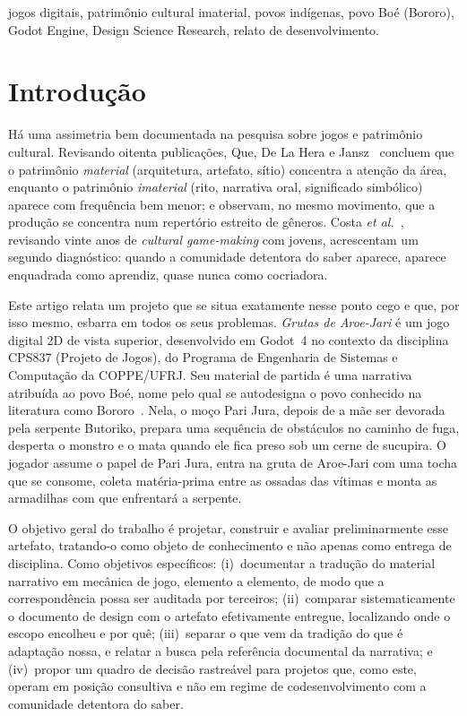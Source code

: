 \documentclass[conference]{IEEEtran}
\begin{document}
\begin{IEEEkeywords}
jogos digitais, patrimônio cultural imaterial, povos indígenas, povo Boé (Bororo),
Godot Engine, Design Science Research, relato de desenvolvimento.
\end{IEEEkeywords}

\section{Introdução}
\label{sec:introducao}

Há uma assimetria bem documentada na pesquisa sobre jogos e patrimônio cultural.
Revisando oitenta publicações, Que, De La Hera e Jansz~\cite{que2025} concluem que o
patrimônio \textit{material} (arquitetura, artefato, sítio) concentra a atenção da área,
enquanto o patrimônio \textit{imaterial} (rito, narrativa oral, significado simbólico)
aparece com frequência bem menor; e observam, no mesmo movimento, que a produção se
concentra num repertório estreito de gêneros. Costa \textit{et al.}~\cite{costa2025},
revisando vinte anos de \textit{cultural game-making} com jovens, acrescentam um segundo
diagnóstico: quando a comunidade detentora do saber aparece, aparece enquadrada como
aprendiz, quase nunca como cocriadora.

Este artigo relata um projeto que se situa exatamente nesse ponto cego e que, por isso
mesmo, esbarra em todos os seus problemas. \textit{Grutas de Aroe-Jari} é um jogo
digital 2D de vista superior, desenvolvido em Godot~4 no contexto da disciplina CPS837
(Projeto de Jogos), do Programa de Engenharia de Sistemas e Computação da COPPE/UFRJ.
Seu material de partida é uma narrativa atribuída ao povo Boé, nome pelo qual se
autodesigna o povo conhecido na literatura como Bororo~\cite{serpa2025}. Nela, o moço
Pari Jura, depois de a mãe ser devorada pela serpente Butoriko, prepara uma sequência de
obstáculos no caminho de fuga, desperta o monstro e o mata quando ele fica preso sob um
cerne de sucupira. O jogador assume o papel de Pari Jura, entra na gruta de Aroe-Jari
com uma tocha que se consome, coleta matéria-prima entre as ossadas das vítimas e monta
as armadilhas com que enfrentará a serpente.

O objetivo geral do trabalho é projetar, construir e avaliar preliminarmente esse
artefato, tratando-o como objeto de conhecimento e não apenas como entrega de
disciplina. Como objetivos específicos: (i)~documentar a tradução do material narrativo
em mecânica de jogo, elemento a elemento, de modo que a correspondência possa ser
auditada por terceiros; (ii)~comparar sistematicamente o documento de design com o
artefato efetivamente entregue, localizando onde o escopo encolheu e por quê;
(iii)~separar o que vem da tradição do que é adaptação nossa, e relatar a busca pela
referência documental da narrativa; e (iv)~propor um quadro de decisão
rastreável para projetos que, como este, operam em posição consultiva e não em regime de
codesenvolvimento com a comunidade detentora do saber.
\end{document}
